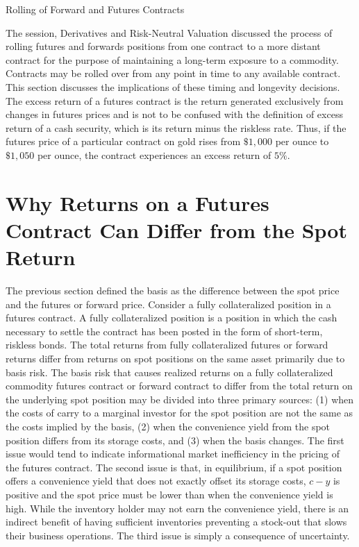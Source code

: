 \documentclass[11pt]{article}
\begin{document}
Rolling of Forward and Futures Contracts

The session, Derivatives and Risk-Neutral Valuation discussed the process of rolling futures and forwards positions from one contract to a more distant contract for the purpose of maintaining a long-term exposure to a commodity. Contracts may be rolled over from any point in time to any available contract. This section discusses the implications of these timing and longevity decisions. The excess return of a futures contract is the return generated exclusively from changes in futures prices and is not to be confused with the definition of excess return of a cash security, which is its return minus the riskless rate. Thus, if the futures price of a particular contract on gold rises from $\$ 1,000$ per ounce to $\$ 1,050$ per ounce, the contract experiences an excess return of $5 \%$.

\section*{Why Returns on a Futures Contract Can Differ from the Spot Return}
The previous section defined the basis as the difference between the spot price and the futures or forward price. Consider a fully collateralized position in a futures contract. A fully collateralized position is a position in which the cash necessary to settle the contract has been posted in the form of short-term, riskless bonds. The total returns from fully collateralized futures or forward returns differ from returns on spot positions on the same asset primarily due to basis risk. The basis risk that causes realized returns on a fully collateralized commodity futures contract or forward contract to differ from the total return on the underlying spot position may be divided into three primary sources: (1) when the costs of carry to a marginal investor for the spot position are not the same as the costs implied by the basis, (2) when the convenience yield from the spot position differs from its storage costs, and (3) when the basis changes. The first issue would tend to indicate informational market inefficiency in the pricing of the futures contract. The second issue is that, in equilibrium, if a spot position offers a convenience yield that does not exactly offset its storage costs, $c-y$ is positive and the spot price must be lower than when the convenience yield is high. While the inventory holder may not earn the convenience yield, there is an indirect benefit of having sufficient inventories preventing a stock-out that slows their business operations. The third issue is simply a consequence of uncertainty.
\end{document}
